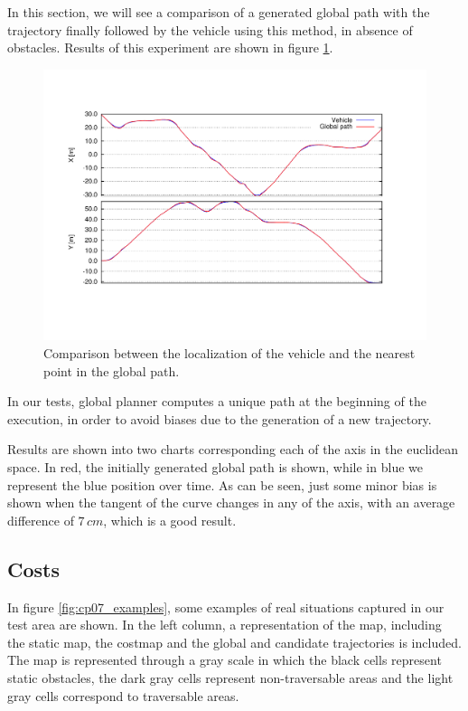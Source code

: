 In this section, we will see a comparison of a generated global path with the trajectory finally followed by the vehicle using this method, in absence of obstacles. Results of this experiment are shown in figure \ref{fig:cp07_localization_diff}.

\begin{figure}[h!]
  \centering
  \includegraphics[trim=50 50 90 60, clip]{differences}
  \caption{Comparison between the localization of the vehicle and the nearest point in the global path.}\label{fig:cp07_localization_diff}
\end{figure}

In our tests, global planner computes a unique path at the beginning of the execution, in order to avoid biases due to the generation of a new trajectory.

Results are shown into two charts corresponding each of the axis in the euclidean space. In red, the initially generated global path is shown, while in blue we represent the blue position over time. As can be seen, just some minor bias is shown when the tangent of the curve changes in any of the axis, with an average difference of $7\,cm$, which is a good result.

\subsection{Costs}\label{ch:chapter07_02_02}

In figure \ref{fig:cp07_examples}, some examples of real situations captured in our test area are shown. In the left column, a representation of the map, including the static map, the costmap and the global and candidate trajectories is included. The map is represented through a gray scale in which the black cells represent static obstacles, the dark gray cells represent non-traversable areas and the light gray cells correspond to traversable areas.


